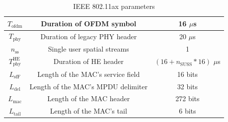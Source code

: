 \documentclass[a4paper]{article}
\begin{document}
\begin{table}[h]
\begin{tabular}{|c|c|c|}
			$T_\text{ofdm}$      & Duration of OFDM symbol     & 16 $\mu$s           \\ \hline
			$T_\text{phy}$      & Duration of legacy PHY header       & 20 $\mu$s           \\ \hline
			$n_\text{ss}$               & Single user spatial streams       & 1           \\ \hline
			$T_\text{phy}^\text{HE}$      & Duration of HE header       & $(16 + n_\text{SUSS} * 16)$ $\mu$s           \\ \hline
			$L_\text{sfF}$      & Length of the MAC's service field       & 16 bits           \\ \hline
			$L_\text{del}$      & Length of the MAC's MPDU delimiter       & 32 bits           \\ \hline
			$L_\text{mac}$      & Length of the MAC header     & 272 bits           \\ \hline
			$L_\text{tail}$      & Length of the MAC's tail     & 6 bits           \\ \hline
			\end{tabular}
			\caption{IEEE 802.11ax parameters}
			\label{table:appendix_table}
		\end{table}

\end{document}
